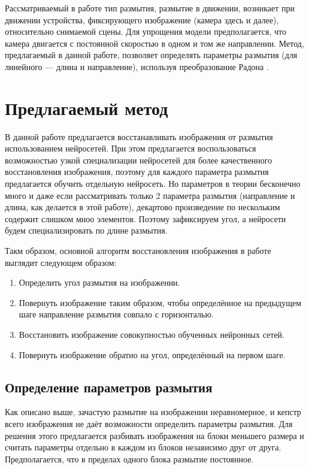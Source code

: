 Рассматриваемый в работе тип размытия, размытие в движении, возникает при движении устройства, фиксирующего изображение (камера здесь и далее), относительно снимаемой сцены. 
Для упрощения модели предполагается, что камера двигается с постоянной скоростью в одном и том же направлении. Метод, предлагаемый в данной работе, позволяет определять параметры размытия (для линейного --- длина и направление), используя преобразование Радона \cite{oliv}.


\newpage
\section{Предлагаемый метод}

В данной работе предлагается восстанавливать изображения от размытия использованием нейросетей. При этом предлагается воспользоваться возможностью узкой специализации нейросетей для более качественного восстановления изображения, поэтому для каждого параметра размытия предлагается обучить отдельную нейросеть. Но параметров в теории бесконечно много и даже если рассматривать только 2 параметра размытия (направление и длина, как делается в этой работе), декартово произведение по нескольким содержит слишком мноо элементов. Поэтому зафиксируем угол, а нейросети будем специализировать по длине размытия.
\par
Такм образом, основной алгоритм восстановления изображения в работе выглядит следующем образом:
\begin{enumerate} 
    \item Определить угол размытия на изображении.
    \item Повернуть изображение таким образом, чтобы определённое на предыдущем шаге направление размытия совпало с горизонталью.
    \item Восстановить изображение совокупностью обученных нейронных сетей.
    \item Повернуть изображение обратно на угол, определённый на первом шаге.
\end{enumerate}


\subsection{Определение параметров размытия}

Как описано выше, зачастую размытие на изображении неравномерное, и кепстр всего изображения не даёт возможности определить параметры размытия. Для решения этого предлагается разбивать изображения на блоки меньшего размера и считать параметры отдельно в каждом из блоков независимо друг от друга.
Предполагается, что в пределах одного блока размытие постоянное.

